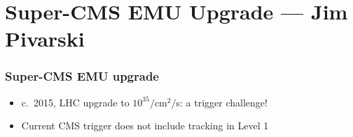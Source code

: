 \documentclass[compress]{beamer}
\begin{document}
\section*{Super-CMS EMU Upgrade --- Jim Pivarski}

\begin{frame}
\frametitle{Super-CMS EMU upgrade}

\begin{itemize}
  \item c.\ 2015, LHC upgrade to $10^{35}/$cm$^2/$s: a trigger challenge!
  \item<2> Current CMS trigger does not include tracking in Level 1
\end{itemize}

\vspace{-0.5 cm}
\begin{center}
\end{center}

\vspace{-0.5 cm}
\end{frame}
\end{document}
